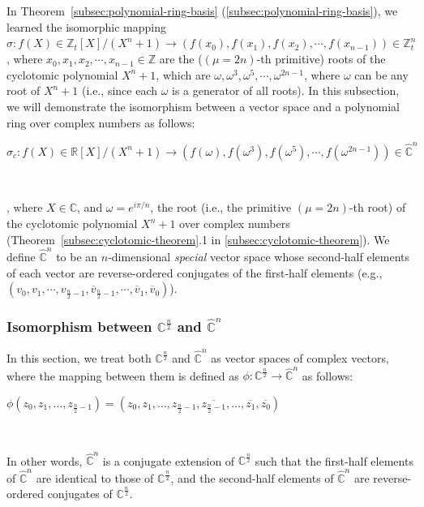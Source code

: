 In Theorem~\ref*{subsec:polynomial-ring-basis} (\autoref{subsec:polynomial-ring-basis}), we learned the isomorphic mapping $\sigma: f(X) \in \mathbb{Z}_t[X]/(X^n + 1) \longrightarrow (f(x_0),f(x_1),f(x_2), \cdots, f(x_{n-1})) \in \mathbb{Z}_t^n$, where $x_0, x_1, x_2, \cdots, x_{n-1} \in \mathbb{Z}$ are the ($(\mu=2n)$-th primitive) roots of the cyclotomic polynomial $X^n + 1$, which are $\omega, \omega^3, \omega^5, \cdots, \omega^{2n-1}$, where $\omega$ can be any root of $X^n + 1$ (i.e., since each $\omega$ is a generator of all roots). In this subsection, we will demonstrate the isomorphism between a vector space and a polynomial ring over complex numbers as follows: 

$\sigma_c: f(X) \in \mathbb{R}[X]/(X^n + 1) \longrightarrow (f(\omega),f(\omega^3),f(\omega^5), \cdots, f(\omega^{2n-1})) \in \mathbb{\hat{C}}^{n}$

$ $

, where $X \in \mathbb{C}$, and $\omega = e^{i\pi/n}$, the root (i.e., the primitive $(\mu=2n)$-th root) of the cyclotomic polynomial $X^n + 1$ over complex numbers (Theorem~\ref*{subsec:cyclotomic-theorem}.1 in \autoref{subsec:cyclotomic-theorem}). We define $\mathbb{\hat{C}}^{n}$ to be an $n$-dimensional \textit{special} vector space whose second-half elements of each vector are reverse-ordered conjugates of the first-half elements (e.g., $(v_0, v_1, \cdots, v_{\frac{n}{2}-1}, \overline{v}_{\frac{n}{2}-1}, \cdots, \overline{v}_1, \overline{v}_0 )$). 

\subsubsection{Isomorphism between $\mathbb{C}^{\frac{n}{2}}$ and $\hat{\mathbb{C}}^{n}$}
\label{subsec:poly-vector-transformation-complex-isomorphism1}

In this section, we treat both $\mathbb{C}^{\frac{n}{2}}$ and $\hat{\mathbb{C}}^{n}$ as vector spaces of complex vectors, where the mapping between them is defined as $\phi: \mathbb{C}^{\frac{n}{2}} \rightarrow \hat{\mathbb{C}}^{n}$ as follows:

$\phi(z_0, z_1, \dots, z_{\frac{n}{2}-1}) = (z_0, z_1, \dots, z_{\frac{n}{2}-1}, \overline{z_{\frac{n}{2}-1}}, \dots, \overline{z_1}, \overline{z_0})$


$ $

In other words, $\hat{\mathbb{C}}^{n}$ is a conjugate extension of $\mathbb{C}^{\frac{n}{2}}$ such that the first-half elements of $\hat{\mathbb{C}}^{n}$ are identical to those of $\mathbb{C}^{\frac{n}{2}}$, and the second-half elements of $\hat{\mathbb{C}}^{n}$ are reverse-ordered conjugates of $\mathbb{C}^{\frac{n}{2}}$. 


